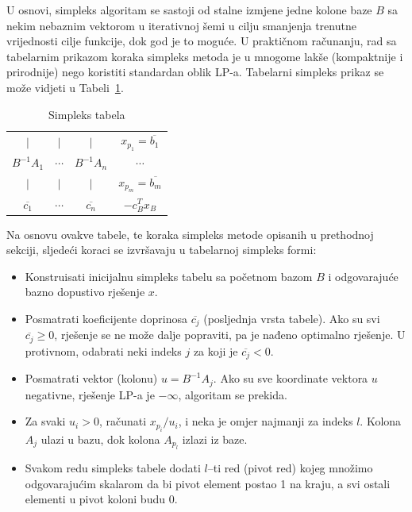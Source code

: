 \documentclass[a4paper, utf8, 11pt, colorlinks]{book}
\begin{document}
U osnovi, simpleks algoritam se sastoji od stalne izmjene jedne kolone baze $B$ sa nekim nebaznim vektorom u iterativnoj šemi u cilju smanjenja trenutne vrijednosti cilje funkcije, dok god je to moguće. 
U praktičnom računanju, rad sa tabelarnim prikazom koraka simpleks metoda je u mnogome lakše (kompaktnije i prirodnije) nego koristiti standardan oblik LP-a. 
Tabelarni simpleks prikaz se može vidjeti u Tabeli~\ref{tab:simplex_tabelau}. 

\begin{table}[!ht]
    \centering
    \begin{tabular}{c c c | c} \\ \hline
            $\mid$          &       $\mid$ &  $\mid$             &    $x_{p_1} = \overline{b_1}$         \\
          $B^{-1}A_1$       &    $\cdots$    &  $B^{-1}A_n$      &    $\cdots$          \\
            $\mid$          &       $\mid$ &  $\mid$             &   $ x_{p_m} = \overline{b_m}$         \\ \hline
          $\overline{c_1}$  &    $\cdots$    & $\overline{c_n}$  &  $-c^T_B x_B$         \\ \hline
    \end{tabular}
    \caption{Simpleks tabela}
    \label{tab:simplex_tabelau}
\end{table}

Na osnovu ovakve tabele, te koraka simpleks metode opisanih u prethodnoj sekciji, sljedeći koraci se izvršavaju u tabelarnoj simpleks formi:
\begin{itemize}
    \item Konstruisati inicijalnu simpleks tabelu sa početnom bazom $B$ i odgovarajuće bazno dopustivo rješenje $x$.
    \item Posmatrati koeficijente doprinosa $\overline{c_j}$ (posljednja vrsta tabele). Ako su svi $\overline{c_j} \geq 0$, rješenje se ne može dalje popraviti, pa je nađeno optimalno rješenje. U protivnom, odabrati neki indeks $j$ za koji je $\overline{c_j}<0$.
    \item Posmatrati vektor (kolonu) $u = B^{-1}A_j$. Ako su sve koordinate vektora $u$ negativne, rješenje LP-a je $-\infty$, algoritam se prekida.
    \item Za svaki $u_i > 0$, računati $x_{p_i}/u_i$, i neka je   omjer najmanji za indeks $l$. Kolona $A_{j}$ ulazi u bazu, dok kolona $A_{p_l}$ izlazi iz baze. 
    \item Svakom redu simpleks tabele dodati $l$--ti red (pivot red) kojeg množimo odgovarajućim
         skalarom da bi pivot element postao 1 na kraju, a svi ostali elementi u pivot koloni budu 0.
\end{itemize}
\end{document}
